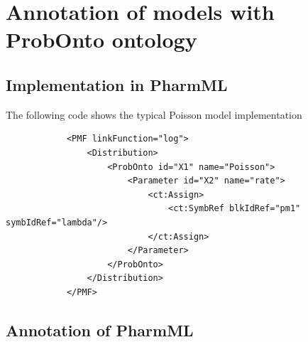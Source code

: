 \section{Annotation of models with ProbOnto ontology}

\subsection{Implementation in PharmML}

The following code shows the typical Poisson model implementation
\lstset{language=XML}
\begin{lstlisting}
            <PMF linkFunction="log">
                <Distribution>
                    <ProbOnto id="X1" name="Poisson">
                        <Parameter id="X2" name="rate">
                            <ct:Assign>
                                <ct:SymbRef blkIdRef="pm1" symbIdRef="lambda"/>
                            </ct:Assign>
                        </Parameter>
                    </ProbOnto>
                </Distribution>
            </PMF>
\end{lstlisting}

\subsection{Annotation of PharmML}

